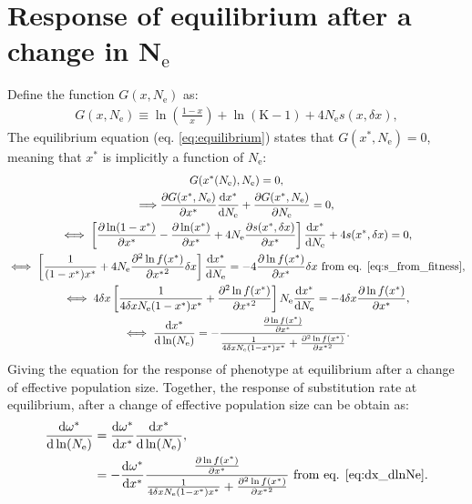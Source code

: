 \documentclass{article}
\newcommand{\der}{\mathrm{d}}
\newcommand{\Ne}{N_{\mathrm{e}}}
\newcommand{\dnds}{\omega}
\newcommand{\Nstate}{\text{K}}
\newcommand{\x}{x}
\newcommand{\eq}{^{*}}
\newcommand{\dx}{\delta \x}
\begin{document}
\section*{Response of equilibrium after a change in $\bm{\Ne}$}
Define the function $G(\x, \Ne )$ as:
\begin{gather}
G(\x, \Ne ) \equiv \ln \left( \frac{1 - \x}{\x} \right) + \ln (\Nstate-1) + 4 \Ne s(\x, \dx), 
\end{gather}
The equilibrium equation (eq. \ref{eq:equilibrium}) states that $G(\x\eq, \Ne )=0$, meaning that $\x\eq$ is implicitly a function of $\Ne$:
\begin{gather}
G(\x\eq(\Ne), \Ne ) = 0, \\
\Longrightarrow \frac{\partial G(\x\eq, \Ne ) }{\partial \x\eq }\frac{ \der \x\eq}{\der \Ne} + \frac{ \partial G(\x\eq, \Ne )}{\partial \Ne} = 0, \\
\iff \left[ \frac{\partial \ln (1-\x\eq) }{\partial \x\eq } - \frac{\partial \ln (\x\eq) }{\partial \x\eq}  + 4 \Ne \frac{ \partial s(\x\eq, \dx) }{\partial \x\eq } \right]\frac{ \der \x\eq}{\der \Ne} + 4 s(\x\eq, \dx) = 0, \\
\iff \left[ \frac{1}{(1 - \x\eq) \x\eq} + 4 \Ne \frac{ \partial^2 \ln f(\x\eq) }{\partial {\x\eq}^2}\dx \right]\frac{ \der \x\eq}{\der \Ne}  = - 4 \frac{ \partial \ln f(\x\eq) }{\partial {\x\eq}}\dx \text{ from eq. \ref{eq:s_from_fitness}}, \\
\iff 4 \dx \left[ \frac{1}{4 \dx \Ne  (1 - \x\eq) \x\eq} + \frac{ \partial^2 \ln f(\x\eq) }{\partial {\x\eq}^2} \right] \Ne \frac{ \der \x\eq}{\der \Ne}  = - 4 \dx \frac{ \partial \ln f(\x\eq) }{\partial {\x\eq}}, \\
\iff \frac{ \der \x\eq}{\der \ln (\Ne)}  = - \frac{\frac{ \partial \ln f(\x\eq) }{\partial {\x\eq}}}{\frac{1}{4 \dx \Ne  (1 - \x\eq) \x\eq} + \frac{ \partial^2 \ln f(\x\eq) }{\partial {\x\eq}^2}}  \label{eq:dx_dlnNe}.
\end{gather}
Giving the equation for the response of phenotype at equilibrium after a change of effective population size.
Together, the response of substitution rate at equilibrium, after a change of effective population size can be obtain as:
\begin{align}
\frac{\der \dnds\eq}{\der \ln (\Ne)} & = \frac{\der \dnds\eq}{\der \x\eq} \frac{ \der \x\eq}{\der \ln (\Ne)}, \\
 &= - \frac{\der \dnds\eq}{\der \x\eq} \frac{\frac{ \partial \ln f(\x\eq) }{\partial {\x\eq}}}{\frac{1}{4 \dx \Ne  (1 - \x\eq) \x\eq} + \frac{ \partial^2 \ln f(\x\eq) }{\partial {\x\eq}^2}} \text{ from eq. \ref{eq:dx_dlnNe}} \label{eq:dw_dlnNe}.
\end{align}
\end{document}
